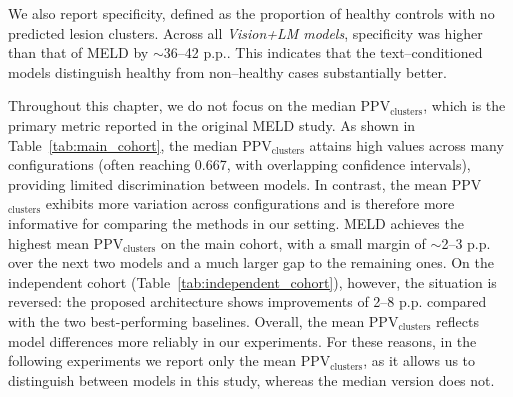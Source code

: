 \documentclass[FCD_GNN.tex]{subfiles}
\begin{document}
We also report specificity, defined as the proportion of healthy controls with no predicted lesion clusters.
Across all \textit{Vision+LM models}, specificity was higher than that of MELD by $\sim$36--42 \ac{p.p.}.
This indicates that the text--conditioned models distinguish healthy from non--healthy cases substantially better.

Throughout this chapter, we do not focus on the median PPV$_{\text{clusters}}$, which is the primary metric reported in the original MELD study.
As shown in Table~\ref{tab:main_cohort}, the median PPV$_{\text{clusters}}$ attains high values across many configurations (often reaching 0.667, with overlapping confidence intervals), providing limited discrimination between models.
In contrast, the mean PPV$_{\text{clusters}}$ exhibits more variation across configurations and is therefore more informative for comparing the methods in our setting.
MELD achieves the highest mean PPV$_{\text{clusters}}$ on the main cohort, with a small margin of $\sim$2--3 \ac{p.p.} over the next two models and a much larger gap to the remaining ones.
On the independent cohort (Table~\ref{tab:independent_cohort}), however, the situation is reversed: the proposed architecture shows improvements of 2--8 \ac{p.p.} compared with the two best-performing baselines.
Overall, the mean PPV$_{\text{clusters}}$ reflects model differences more reliably in our experiments.
For these reasons, in the following experiments we report only the mean PPV$_{\text{clusters}}$, as it allows us to distinguish between models in this study, whereas the median version does not.
\end{document}
